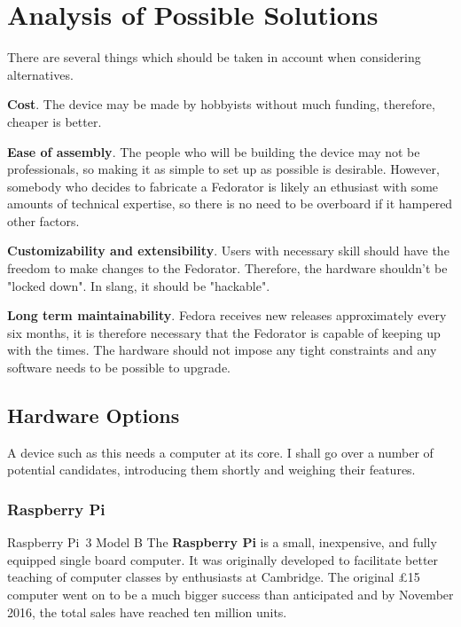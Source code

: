 \chapter{Analysis of Possible Solutions}
    There are several things which should be taken in account when considering alternatives.
    
    \textbf{Cost}.  The device may be made by hobbyists without much funding, therefore, cheaper is better.
    
    \textbf{Ease of assembly}.  The people who will be building the device may not be professionals, so making it as simple to set up as possible is desirable.  However, somebody who decides to fabricate a Fedorator is likely an ethusiast with some amounts of technical expertise, so there is no need to be overboard if it hampered other factors.
    
    \textbf{Customizability and extensibility}.  Users with necessary skill should have the freedom to make changes to the Fedorator.  Therefore, the hardware shouldn't be "locked down".  In slang, it should be "hackable".
    
    \textbf{Long term maintainability}.  Fedora receives new releases approximately every six months\cite{fedora-release-life-cycle}, it is therefore necessary that the Fedorator is capable of keeping up with the times.  The hardware should not impose any tight constraints and any software needs to be possible to upgrade.
    
    \section{Hardware Options}
        A device such as this needs a computer at its core.  I shall go over a number of potential candidates, introducing them shortly and weighing their features.
        \subsection{Raspberry Pi}
                {Raspberry Pi~3 Model B \cite{rpi-pimoroni}}
            The \textbf{Raspberry Pi} is a small, inexpensive, and fully equipped single board computer.  It was originally developed to facilitate better teaching of computer classes by enthusiasts at Cambridge\cite{bbc-15-pound-computer}.  The original £15 computer went on to be a much bigger success than anticipated and by November 2016, the total sales have reached ten million units\cite{rpi-ten-million}.
            
